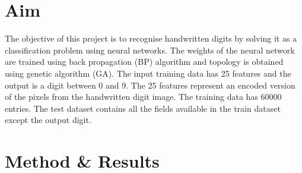 

\section{Aim}
The objective of this project is to recognise handwritten digits by solving it as a classification problem using neural networks. The weights of the neural network are trained using back propagation (BP) algorithm and topology is obtained using genetic algorithm (GA).  The input training data has 25 features and the output is a digit between 0 and 9. The 25 features represent an encoded version of the pixels from the handwritten digit image. The training data has 60000 entries. The test dataset contains all the fields available in the train dataset except the output digit.
\section{Method \& Results}
